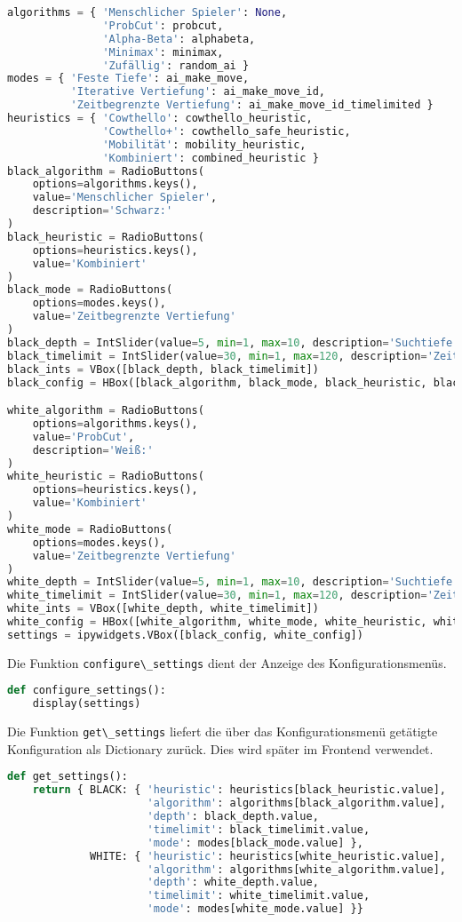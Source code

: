 \begin{lstlisting}[language=Python]
algorithms = { 'Menschlicher Spieler': None,
               'ProbCut': probcut,
               'Alpha-Beta': alphabeta,
               'Minimax': minimax,
               'Zufällig': random_ai }
modes = { 'Feste Tiefe': ai_make_move,
          'Iterative Vertiefung': ai_make_move_id,
          'Zeitbegrenzte Vertiefung': ai_make_move_id_timelimited }
heuristics = { 'Cowthello': cowthello_heuristic,
               'Cowthello+': cowthello_safe_heuristic,
               'Mobilität': mobility_heuristic,
               'Kombiniert': combined_heuristic }
black_algorithm = RadioButtons(
    options=algorithms.keys(),
    value='Menschlicher Spieler',
    description='Schwarz:'
)
black_heuristic = RadioButtons(
    options=heuristics.keys(),
    value='Kombiniert'
)
black_mode = RadioButtons(
    options=modes.keys(),
    value='Zeitbegrenzte Vertiefung'
)
black_depth = IntSlider(value=5, min=1, max=10, description='Suchtiefe:')
black_timelimit = IntSlider(value=30, min=1, max=120, description='Zeitlimit:')
black_ints = VBox([black_depth, black_timelimit])
black_config = HBox([black_algorithm, black_mode, black_heuristic, black_ints])

white_algorithm = RadioButtons(
    options=algorithms.keys(),
    value='ProbCut',
    description='Weiß:'
)
white_heuristic = RadioButtons(
    options=heuristics.keys(),
    value='Kombiniert'
)
white_mode = RadioButtons(
    options=modes.keys(),
    value='Zeitbegrenzte Vertiefung'
)
white_depth = IntSlider(value=5, min=1, max=10, description='Suchtiefe:')
white_timelimit = IntSlider(value=30, min=1, max=120, description='Zeitlimit:')
white_ints = VBox([white_depth, white_timelimit])
white_config = HBox([white_algorithm, white_mode, white_heuristic, white_ints])
settings = ipywidgets.VBox([black_config, white_config])
\end{lstlisting}

Die Funktion \passthrough{\lstinline!configure\_settings!} dient der
Anzeige des Konfigurationsmenüs.

\begin{lstlisting}[language=Python]
def configure_settings():
    display(settings)
\end{lstlisting}

Die Funktion \passthrough{\lstinline!get\_settings!} liefert die über
das Konfigurationsmenü getätigte Konfiguration als Dictionary zurück.
Dies wird später im Frontend verwendet.

\begin{lstlisting}[language=Python]
def get_settings():
    return { BLACK: { 'heuristic': heuristics[black_heuristic.value],
                      'algorithm': algorithms[black_algorithm.value],
                      'depth': black_depth.value,
                      'timelimit': black_timelimit.value,
                      'mode': modes[black_mode.value] },
             WHITE: { 'heuristic': heuristics[white_heuristic.value],
                      'algorithm': algorithms[white_algorithm.value],
                      'depth': white_depth.value,
                      'timelimit': white_timelimit.value,
                      'mode': modes[white_mode.value] }}
\end{lstlisting}

